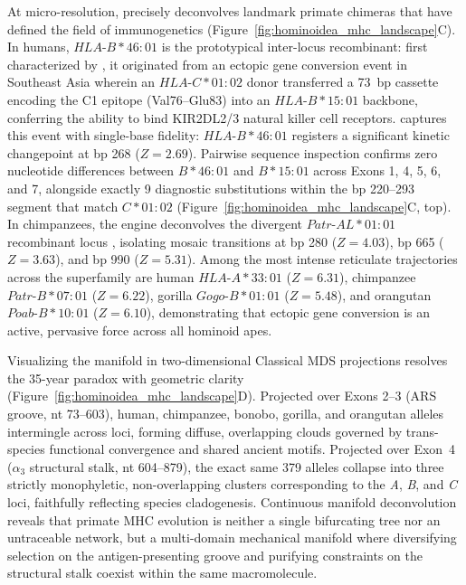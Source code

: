 At micro-resolution, \RhizAeon precisely deconvolves landmark primate chimeras that have defined the field of immunogenetics (Figure~\ref{fig:hominoidea_mhc_landscape}C).
In humans, $HLA\text{-}B*46:01$ is the prototypical inter-locus recombinant: first characterized by \citet{barber1996inter}, it originated from an ectopic gene conversion event in Southeast Asia wherein an $HLA\text{-}C*01:02$ donor transferred a 73~bp cassette encoding the C1 epitope (Val76--Glu83) into an $HLA\text{-}B*15:01$ backbone, conferring the ability to bind KIR2DL2/3 natural killer cell receptors.
\RhizAeon captures this event with single-base fidelity: $HLA\text{-}B*46:01$ registers a significant kinetic changepoint at bp 268 ($Z = 2.69$).
Pairwise sequence inspection confirms zero nucleotide differences between $B*46:01$ and $B*15:01$ across Exons 1, 4, 5, 6, and 7, alongside exactly 9 diagnostic substitutions within the bp 220--293 segment that match $C*01:02$ (Figure~\ref{fig:hominoidea_mhc_landscape}C, top).
In chimpanzees, the engine deconvolves the divergent $Patr\text{-}AL*01:01$ recombinant locus \citep{geller2002linkage}, isolating mosaic transitions at bp 280 ($Z = 4.03$), bp 665 ($Z = 3.63$), and bp 990 ($Z = 5.31$).
Among the most intense reticulate trajectories across the superfamily are human $HLA\text{-}A*33:01$ ($Z = 6.31$), chimpanzee $Patr\text{-}B*07:01$ ($Z = 6.22$), gorilla $Gogo\text{-}B*01:01$ ($Z = 5.48$), and orangutan $Poab\text{-}B*10:01$ ($Z = 6.10$), demonstrating that ectopic gene conversion is an active, pervasive force across all hominoid apes.

Visualizing the manifold in two-dimensional Classical MDS projections resolves the 35-year paradox with geometric clarity (Figure~\ref{fig:hominoidea_mhc_landscape}D).
Projected over Exons 2--3 (ARS groove, nt 73--603), human, chimpanzee, bonobo, gorilla, and orangutan alleles intermingle across loci, forming diffuse, overlapping clouds governed by trans-species functional convergence and shared ancient motifs.
Projected over Exon~4 ($\alpha_3$ structural stalk, nt 604--879), the exact same 379 alleles collapse into three strictly monophyletic, non-overlapping clusters corresponding to the \textit{A}, \textit{B}, and \textit{C} loci, faithfully reflecting species cladogenesis.
Continuous manifold deconvolution reveals that primate MHC evolution is neither a single bifurcating tree nor an untraceable network, but a multi-domain mechanical manifold where diversifying selection on the antigen-presenting groove and purifying constraints on the structural stalk coexist within the same macromolecule.

